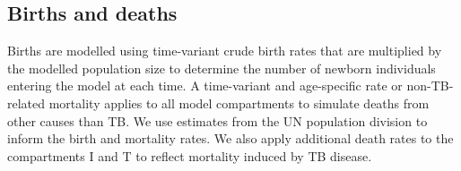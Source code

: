 \subsection{Births and deaths}
Births are modelled using time-variant crude birth rates that are multiplied by the modelled population 
size to determine the number of newborn individuals entering the model at each time. A time-variant 
and age-specific rate or non-TB-related mortality applies to all model compartments to simulate 
deaths from other causes than TB. We use estimates from the UN population division to inform the 
birth and mortality rates.
We also apply additional death rates to the compartments I and T to reflect mortality induced by TB 
disease.